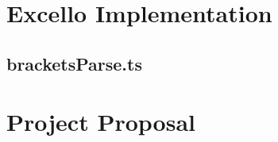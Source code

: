 \documentclass[12pt,a4paper,twoside,openright]{report}
\begin{document}





% 

%
% 


\pagestyle{headings}





%









\appendix

\chapter{Excello Implementation}

\section{bracketsParse.ts}
\label{appendix:parenthesis}
{\scriptsize}

\chapter{Project Proposal}



% 

\end{document}

